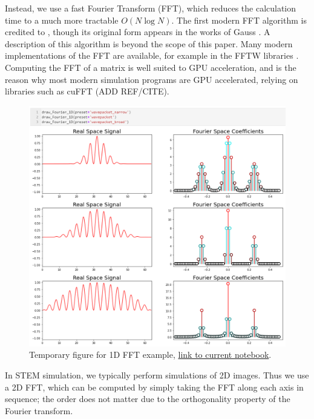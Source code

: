 \documentclass[%
 superscriptaddress,
 aip,
 amsmath,amssymb,
preprint,%
 author-year,%
longbibliography
]{revtex4-2}
\begin{document}
Instead, we use a fast Fourier Transform (FFT), which reduces the calculation time to a much more tractable $O(N \log N)$. The first modern FFT algorithm is credited to \cite{cooley1965algorithm}, though its original form appears in the works of Gauss \citep{heideman1985gauss}. A description of this algorithm is beyond the scope of this paper. Many modern implementations of the FFT are available, for example in the FFTW libraries \citep{frigo2005design}. Computing the FFT of a matrix is well suited to GPU acceleration, and is the reason why most modern simulation programs are GPU accelerated, relying on libraries such as cuFFT (ADD REF/CITE). 

\begin{figure}[htbp]
    \includegraphics[width=1.0\textwidth]{figures/temp_figure_1D_FFT.png}
    \caption{ Temporary figure for 1D FFT example, \href{https://github.com/tem-elements/tem-elements/blob/main/notebooks/Fourier_Transform_1D.ipynb}{link to current notebook}.}
    \label{vis:1d_fourier}
\end{figure}

In STEM simulation, we typically perform simulations of 2D images. Thus we use a 2D FFT, which can be computed by simply taking the FFT along each axis in sequence; the order does not matter due to the orthogonality property of the Fourier transform.
\end{document}
